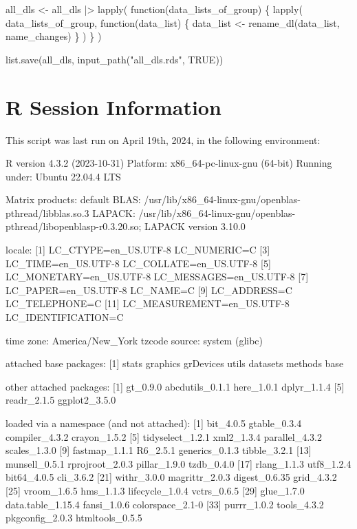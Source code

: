 \documentclass[
  letterpaper,
  DIV=11,
  numbers=noendperiod]{scrreprt}
\newenvironment{Shaded}{\begin{snugshade}}{\end{snugshade}}
\newcommand{\ConstantTok}[1]{\textcolor[rgb]{0.56,0.35,0.01}{#1}}
\newcommand{\ControlFlowTok}[1]{\textcolor[rgb]{0.00,0.23,0.31}{#1}}
\newcommand{\FunctionTok}[1]{\textcolor[rgb]{0.28,0.35,0.67}{#1}}
\newcommand{\NormalTok}[1]{\textcolor[rgb]{0.00,0.23,0.31}{#1}}
\newcommand{\OtherTok}[1]{\textcolor[rgb]{0.00,0.23,0.31}{#1}}
\newcommand{\SpecialCharTok}[1]{\textcolor[rgb]{0.37,0.37,0.37}{#1}}
\newcommand{\StringTok}[1]{\textcolor[rgb]{0.13,0.47,0.30}{#1}}
\begin{document}
\begin{Shaded}
\begin{Highlighting}[]
\NormalTok{all\_dls }\OtherTok{\textless{}{-}}\NormalTok{ all\_dls }\SpecialCharTok{|\textgreater{}}
    \FunctionTok{lapply}\NormalTok{(}
        \ControlFlowTok{function}\NormalTok{(data\_lists\_of\_group) \{}
            \FunctionTok{lapply}\NormalTok{(}
\NormalTok{                data\_lists\_of\_group,}
                \ControlFlowTok{function}\NormalTok{(data\_list) \{}
\NormalTok{                    data\_list }\OtherTok{\textless{}{-}} \FunctionTok{rename\_dl}\NormalTok{(data\_list, name\_changes)}
\NormalTok{                \}}
\NormalTok{            )}
\NormalTok{        \}}
\NormalTok{    )}

\FunctionTok{list.save}\NormalTok{(all\_dls, }\FunctionTok{input\_path}\NormalTok{(}\StringTok{"all\_dls.rds"}\NormalTok{, }\ConstantTok{TRUE}\NormalTok{))}
\end{Highlighting}
\end{Shaded}

\chapter{R Session Information}\label{r-session-information-1}

This script was last run on April 19th, 2024, in the following
environment:

R version 4.3.2 (2023-10-31) Platform: x86\_64-pc-linux-gnu (64-bit)
Running under: Ubuntu 22.04.4 LTS

Matrix products: default BLAS:
/usr/lib/x86\_64-linux-gnu/openblas-pthread/libblas.so.3 LAPACK:
/usr/lib/x86\_64-linux-gnu/openblas-pthread/libopenblasp-r0.3.20.so;
LAPACK version 3.10.0

locale: {[}1{]} LC\_CTYPE=en\_US.UTF-8 LC\_NUMERIC=C {[}3{]}
LC\_TIME=en\_US.UTF-8 LC\_COLLATE=en\_US.UTF-8 {[}5{]}
LC\_MONETARY=en\_US.UTF-8 LC\_MESSAGES=en\_US.UTF-8 {[}7{]}
LC\_PAPER=en\_US.UTF-8 LC\_NAME=C {[}9{]} LC\_ADDRESS=C LC\_TELEPHONE=C
{[}11{]} LC\_MEASUREMENT=en\_US.UTF-8 LC\_IDENTIFICATION=C

time zone: America/New\_York tzcode source: system (glibc)

attached base packages: {[}1{]} stats graphics grDevices utils datasets
methods base

other attached packages: {[}1{]} gt\_0.9.0 abcdutils\_0.1.1 here\_1.0.1
dplyr\_1.1.4 {[}5{]} readr\_2.1.5 ggplot2\_3.5.0

loaded via a namespace (and not attached): {[}1{]} bit\_4.0.5
gtable\_0.3.4 compiler\_4.3.2 crayon\_1.5.2 {[}5{]} tidyselect\_1.2.1
xml2\_1.3.4 parallel\_4.3.2 scales\_1.3.0 {[}9{]} fastmap\_1.1.1
R6\_2.5.1 generics\_0.1.3 tibble\_3.2.1 {[}13{]} munsell\_0.5.1
rprojroot\_2.0.3 pillar\_1.9.0 tzdb\_0.4.0 {[}17{]} rlang\_1.1.3
utf8\_1.2.4 bit64\_4.0.5 cli\_3.6.2 {[}21{]} withr\_3.0.0
magrittr\_2.0.3 digest\_0.6.35 grid\_4.3.2 {[}25{]} vroom\_1.6.5
hms\_1.1.3 lifecycle\_1.0.4 vctrs\_0.6.5 {[}29{]} glue\_1.7.0
data.table\_1.15.4 fansi\_1.0.6 colorspace\_2.1-0 {[}33{]} purrr\_1.0.2
tools\_4.3.2 pkgconfig\_2.0.3 htmltools\_0.5.5
\end{document}

